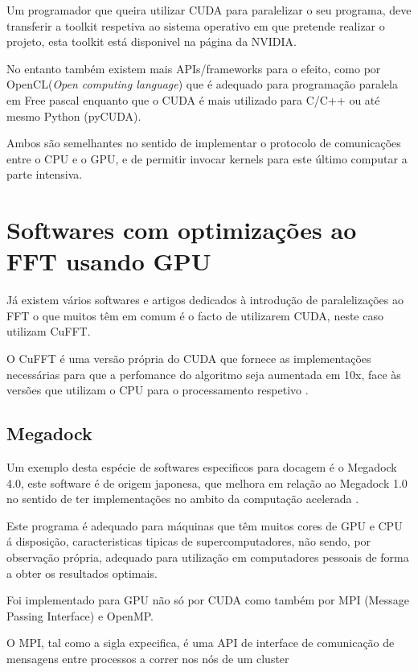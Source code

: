 Um programador que queira utilizar CUDA para paralelizar o seu programa, deve transferir a toolkit respetiva ao sistema operativo em que pretende realizar o projeto, esta toolkit está disponivel na página da NVIDIA.
   
No entanto também existem mais APIs/frameworks para o efeito, como por OpenCL(\textit{Open computing language}) que é adequado para programação paralela em Free pascal enquanto que o CUDA é mais utilizado para C/C++ ou até mesmo Python (pyCUDA). 

Ambos são semelhantes no sentido de implementar o protocolo de comunicações entre o CPU e o GPU, e de permitir invocar kernels para este último computar a parte intensiva.


\section{Softwares com optimizações ao FFT usando GPU}
\label{gpus1}
Já existem vários softwares e artigos dedicados à introdução de paralelizações ao FFT \cite{ritchiew} o que muitos têm em comum é o facto de utilizarem CUDA, neste caso utilizam CuFFT. 

O CuFFT é uma versão própria do CUDA que fornece as implementações necessárias para que a perfomance do algoritmo seja aumentada em 10x, face às versões que utilizam o CPU para o processamento respetivo\cite{nvidiaFFT} . 

\subsection {Megadock}
Um exemplo desta espécie de softwares especificos para docagem é o Megadock 4.0, este software é de origem japonesa, que melhora em relação ao Megadock 1.0 no sentido de ter implementações no ambito da computação acelerada \cite{megadock}.

Este programa é adequado para máquinas que têm muitos cores de GPU e CPU á disposição, caracteristicas tipicas de supercomputadores, não sendo, por observação própria, adequado para utilização em computadores pessoais de forma a obter os resultados optimais.
 
Foi implementado para GPU não só por CUDA como também por MPI (Message Passing Interface) e OpenMP. 
 
 O MPI, tal como a sigla expecifica, é uma API de interface de comunicação de mensagens entre processos a correr nos nós de um cluster\cite{mpiBook} %
 
